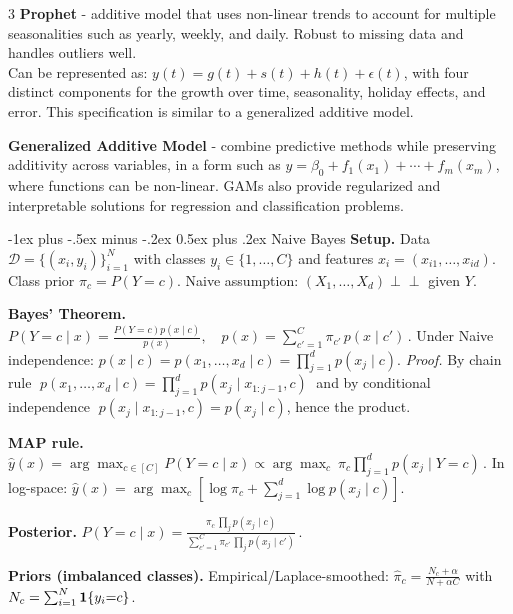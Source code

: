 \documentclass[10pt,landscape]{article}
\makeatletter
\renewcommand{\section}{\@startsection{section}{1}{0mm}%
                                {-1ex plus -.5ex minus -.2ex}%
                                {0.5ex plus .2ex}%
                                {\normalfont\large\bfseries}}
\makeatother
\begin{document}
\begin{multicols}{3}
        \textbf{Prophet} - additive model that uses non-linear trends to account for multiple seasonalities such as yearly, weekly, and daily. Robust to missing data and handles outliers well.\\ Can be represented as: $y(t) = g(t) + s(t) + h(t) + \epsilon(t)$, with four distinct components for the growth over time, seasonality, holiday effects, and error. This specification is similar to a generalized additive model.
        \smallskip

        \textbf{Generalized Additive Model} - combine predictive methods while preserving additivity across variables, in a form such as
    $y = \beta_0 + f_1(x_1) + \cdots + f_m(x_m)$, where functions can be non-linear. GAMs also provide regularized and interpretable solutions for regression and classification problems.

        \section{Naive Bayes}
        \textbf{Setup.} Data $\mathcal{D}=\{(x_i,y_i)\}_{i=1}^N$ with classes $y_i\in\{1,\ldots,C\}$ and features $x_i=(x_{i1},\ldots,x_{id})$. Class prior $\pi_c=P(Y{=}c)$. Naive assumption: $(X_1,\ldots,X_d)\perp\!\!\!\perp$ given $Y$.
        \vspace{.2em}

        \textbf{Bayes' Theorem.}
    $\displaystyle P(Y{=}c\mid x)=\frac{P(Y{=}c)p(x\mid c)}{p(x)},\quad
    p(x)=\sum_{c'=1}^C \pi_{c'}\,p(x\mid c')\,.$
        \; Under Naive independence: $\displaystyle p(x\mid c)=p(x_1,\ldots,x_d\mid c)=\prod_{j=1}^d p(x_j\mid c)$.
        \; \textit{Proof.} By chain rule $\;p(x_1,\ldots,x_d\mid c)=\prod_{j=1}^d p(x_j\mid x_{1:j-1},c)\;$ and by conditional independence $\;p(x_j\mid x_{1:j-1},c)=p(x_j\mid c)$, hence the product.

        \textbf{MAP rule.} $\displaystyle \hat y(x)=\arg\max_{c\in[C]} P(Y{=}c\mid x) \propto \arg\max_{c}\ \pi_c\prod_{j=1}^d p(x_j\mid Y{=}c) \,.$
        \; In log-space: $\displaystyle \hat y(x)=\arg\max_c \left[\log\pi_c+\sum_{j=1}^d \log p(x_j\mid c)\right]$.
        \vspace{.2em}

        \textbf{Posterior.} $\displaystyle P(Y{=}c\mid x)=\frac{\pi_c\,\prod_{j} p(x_j\mid c)}{\sum_{c'=1}^C \pi_{c'}\,\prod_{j} p(x_j\mid c')}\,.$
        \vspace{.2em}

        \textbf{Priors (imbalanced classes).} Empirical/Laplace-smoothed: $\displaystyle \hat\pi_c=\frac{N_c+\alpha}{N+\alpha C}$ with $N_c=\sum_{i=1}^N \mathbf{1}\{y_i{=}c\}$.
        \vspace{.2em}


\end{multicols}
\end{document}
